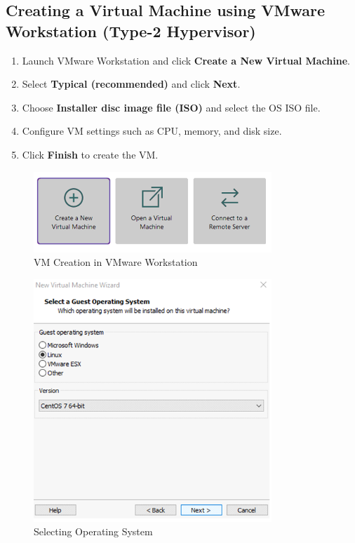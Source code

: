 \documentclass[a4paper,12pt]{article}
\begin{document}
\subsection{Creating a Virtual Machine using VMware Workstation (Type-2 Hypervisor)}
\begin{enumerate}
    \item Launch VMware Workstation and click \textbf{Create a New Virtual Machine}.
    \item Select \textbf{Typical (recommended)} and click \textbf{Next}.
    \item Choose \textbf{Installer disc image file (ISO)} and select the OS ISO file.
    \item Configure VM settings such as CPU, memory, and disk size.
    \item Click \textbf{Finish} to create the VM.
\end{enumerate}
\begin{figure}[H]
    \centering
    \includegraphics[width=0.8\textwidth]{images/vmware_workstation_setup.png}  %
    \caption{VM Creation in VMware Workstation}
\end{figure}

\begin{figure}[H]
    \centering
    \includegraphics[width=0.8\textwidth]{images/guest_os.png}  %
    \caption{Selecting Operating System}
\end{figure}
\end{document}
